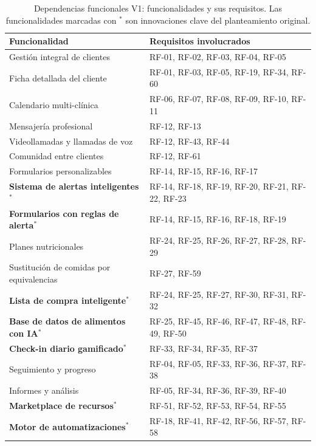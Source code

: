 \begin{table}[htbp]
\centering
\small
\begin{tabular}{|p{5cm}|p{8.5cm}|}
\hline
\textbf{Funcionalidad} & \textbf{Requisitos involucrados} \\
\hline
Gestión integral de clientes & RF-01, RF-02, RF-03, RF-04, RF-05 \\
\hline
Ficha detallada del cliente & RF-01, RF-03, RF-05, RF-19, RF-34, RF-60 \\
\hline
Calendario multi-clínica & RF-06, RF-07, RF-08, RF-09, RF-10, RF-11 \\
\hline
Mensajería profesional & RF-12, RF-13 \\
\hline
Videollamadas y llamadas de voz & RF-12, RF-43, RF-44 \\
\hline
Comunidad entre clientes & RF-12, RF-61 \\
\hline
Formularios personalizables & RF-14, RF-15, RF-16, RF-17 \\
\hline
\textbf{Sistema de alertas inteligentes}$^*$ & RF-14, RF-18, RF-19, RF-20, RF-21, RF-22, RF-23 \\
\hline
\textbf{Formularios con reglas de alerta}$^*$ & RF-14, RF-15, RF-16, RF-18, RF-19 \\
\hline
Planes nutricionales & RF-24, RF-25, RF-26, RF-27, RF-28, RF-29 \\
\hline
Sustitución de comidas por equivalencias & RF-27, RF-59 \\
\hline
\textbf{Lista de compra inteligente}$^*$ & RF-24, RF-25, RF-27, RF-30, RF-31, RF-32 \\
\hline
\textbf{Base de datos de alimentos con IA}$^*$ & RF-25, RF-45, RF-46, RF-47, RF-48, RF-49, RF-50 \\
\hline
\textbf{Check-in diario gamificado}$^*$ & RF-33, RF-34, RF-35, RF-37 \\
\hline
Seguimiento y progreso & RF-04, RF-05, RF-33, RF-36, RF-37, RF-38 \\
\hline
Informes y análisis & RF-05, RF-34, RF-36, RF-39, RF-40 \\
\hline
\textbf{Marketplace de recursos}$^*$ & RF-51, RF-52, RF-53, RF-54, RF-55 \\
\hline
\textbf{Motor de automatizaciones}$^*$ & RF-18, RF-41, RF-42, RF-56, RF-57, RF-58 \\
\hline
\end{tabular}
\caption{Dependencias funcionales V1: funcionalidades y sus requisitos. Las funcionalidades marcadas con $^*$ son innovaciones clave del planteamiento original.}
\label{tab:dependencias-v1}
\end{table}

